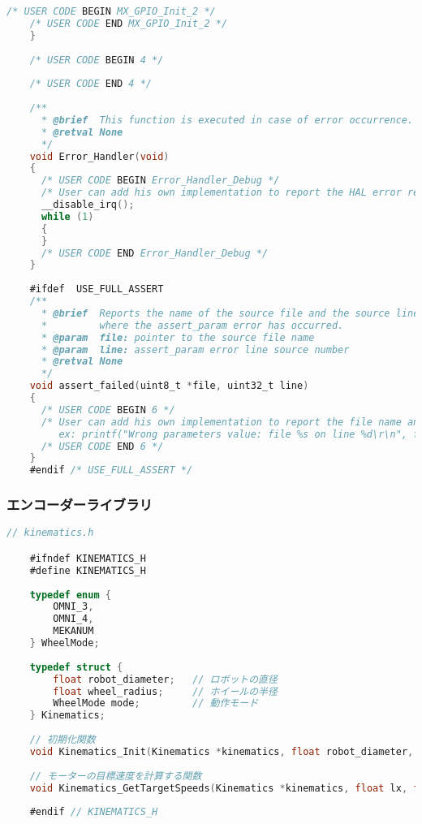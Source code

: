 \begin{lstlisting}[language=C, caption=メインコード(main.c)]
    /* USER CODE BEGIN MX_GPIO_Init_2 */
    /* USER CODE END MX_GPIO_Init_2 */
    }
    
    /* USER CODE BEGIN 4 */
    
    /* USER CODE END 4 */
    
    /**
      * @brief  This function is executed in case of error occurrence.
      * @retval None
      */
    void Error_Handler(void)
    {
      /* USER CODE BEGIN Error_Handler_Debug */
      /* User can add his own implementation to report the HAL error return state */
      __disable_irq();
      while (1)
      {
      }
      /* USER CODE END Error_Handler_Debug */
    }
    
    #ifdef  USE_FULL_ASSERT
    /**
      * @brief  Reports the name of the source file and the source line number
      *         where the assert_param error has occurred.
      * @param  file: pointer to the source file name
      * @param  line: assert_param error line source number
      * @retval None
      */
    void assert_failed(uint8_t *file, uint32_t line)
    {
      /* USER CODE BEGIN 6 */
      /* User can add his own implementation to report the file name and line number,
         ex: printf("Wrong parameters value: file %s on line %d\r\n", file, line) */
      /* USER CODE END 6 */
    }
    #endif /* USE_FULL_ASSERT */

\end{lstlisting}

\subsubsection{エンコーダーライブラリ}

\begin{lstlisting}[language=C, caption=エンコーダーライブラリ(encoder.h)]
    // kinematics.h

    #ifndef KINEMATICS_H
    #define KINEMATICS_H
    
    typedef enum {
        OMNI_3,
        OMNI_4,
        MEKANUM
    } WheelMode;
    
    typedef struct {
        float robot_diameter;   // ロボットの直径
        float wheel_radius;     // ホイールの半径
        WheelMode mode;         // 動作モード
    } Kinematics;
    
    // 初期化関数
    void Kinematics_Init(Kinematics *kinematics, float robot_diameter, float wheel_radius, WheelMode mode);
    
    // モーターの目標速度を計算する関数
    void Kinematics_GetTargetSpeeds(Kinematics *kinematics, float lx, float ly, float rx, float *speedFR, float *speedFL, float *speedBR, float *speedBL);
    
    #endif // KINEMATICS_H
\end{lstlisting}


